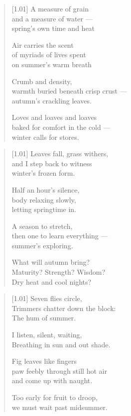 \begin{verse}[1.01\textwidth]
  A measure of grain\\
  and a measure of water ---\\
  spring's own time and heat

  Air carries the scent\\
  of myriads of lives spent\\
  on summer's warm breath

  Crumb and density,\\
  warmth buried beneath crisp crust ---\\
  autumn's crackling leaves.

  Loves and loaves and loaves\\
  baked for comfort in the cold ---\\
  winter calls for stores.
\end{verse}

\newpage

\begin{verse}[1.01\textwidth]
  Leaves fall, grass withers,\\
  and I step back to witness\\
  winter's frozen form.

  Half an hour's silence,\\
  body relaxing slowly,\\
  letting springtime in.

  A season to stretch,\\
  then one to learn everything ---\\
  summer's exploring.

  What will autumn bring?\\
  Maturity? Strength? Wisdom?\\
  Dry heat and cool nights?
\end{verse}

\newpage

\begin{verse}[1.01\textwidth]
    Seven flies circle,\\
    Trimmers chatter down the block:\\
    The hum of summer.

    \vin I listen, silent, waiting,\\
    \vin Breathing in sun and out shade.

    Fig leaves like fingers\\
    paw feebly through still hot air\\
    and come up with naught.

    \vin Too early for fruit to droop,\\
    \vin we must wait past midsummer.
  \end{verse}

